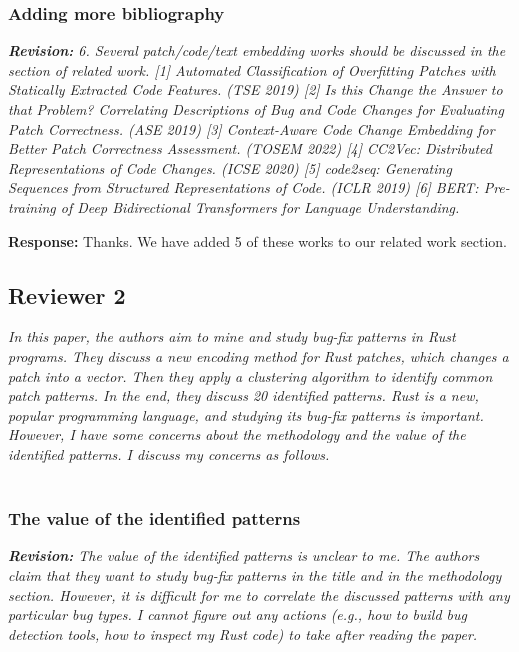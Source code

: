 \documentclass{article}
\begin{document}
\subsubsection{Adding more bibliography}

\textit{\textbf{Revision:} 6. Several patch/code/text embedding works should be discussed in the section of related work.
[1] Automated Classification of Overfitting Patches with Statically Extracted Code Features. (TSE 2019)
[2] Is this Change the Answer to that Problem? Correlating Descriptions of Bug and Code Changes for Evaluating Patch Correctness. (ASE 2019)
[3] Context-Aware Code Change Embedding for Better Patch Correctness Assessment. (TOSEM 2022)
[4] CC2Vec: Distributed Representations of Code Changes. (ICSE 2020)
[5] code2seq: Generating Sequences from Structured Representations of Code. (ICLR 2019)
[6] BERT: Pre-training of Deep Bidirectional Transformers for Language Understanding.}

\textbf{Response:} Thanks. We have added 5 of these works to our related work section.

\subsection{Reviewer 2}

\textit{In this paper, the authors aim to mine and study bug-fix patterns in Rust programs. They discuss a new encoding method for Rust patches, which changes a patch into a vector. Then they apply a clustering algorithm to identify common patch patterns. In the end, they discuss 20 identified patterns.
Rust is a new, popular programming language, and studying its bug-fix patterns is important. However, I have some concerns about the methodology and the value of the identified patterns. I discuss my concerns as follows.} \\ \\

\subsubsection{The value of the identified patterns}

\textit{\textbf{Revision:} The value of the identified patterns is unclear to me. The authors claim that they want to study bug-fix patterns in the title and in the methodology section. However, it is difficult for me to correlate the discussed patterns with any particular bug types. I cannot figure out any actions (e.g., how to build bug detection tools, how to inspect my Rust code) to take after reading the paper.}
\end{document}
